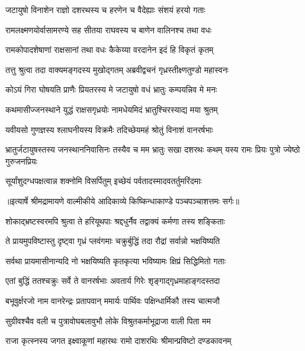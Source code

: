 \twolineshloka
{जटायुषो विनाशेन राज्ञो दशरथस्य च}
{हरणेन च वैदेह्याः संशयं हरयो गताः} %

\twolineshloka
{रामलक्ष्मणयोर्वासामरण्ये सह सीतया}
{राघवस्य च बाणेन वालिनश्च तथा वधः} %

\twolineshloka
{रामकोपादशेषाणां राक्षसानां तथा वधः}
{कैकेय्या वरदानेन इदं हि विकृतं कृतम्} %

\twolineshloka
{तत्तु श्रुत्वा तदा वाक्यमङ्गदस्य मुखोद्गतम्}
{अब्रवीद्वचनं गृध्रस्तीक्ष्णतुण्डो महास्वनः} %

\twolineshloka
{कोऽयं गिरा घोषयति प्राणैः प्रियतरस्य मे}
{जटायुषो वधं भ्रातुः कम्पयन्निव मे मनः} %

\twolineshloka
{कथमासीज्जनस्थाने युद्धं राक्षसगृध्रयोः}
{नामधेयमिदं भ्रातुश्चिरस्याद्य मया श्रुतम्} %

\twolineshloka
{यवीयसो गुणज्ञस्य श्लाघनीयस्य विक्रमैः}
{तदिच्छेयमहं श्रोतुं विनाशं वानरर्षभाः} %

\threelineshloka
{भ्रातुर्जटायुषस्तस्य जनस्थाननिवासिनः}
{तस्यैव च मम भ्रातुः सखा दशरथः कथम्}
{यस्य रामः प्रियः पुत्रो ज्येष्ठो गुरुजनप्रियः} %

\twolineshloka
{सूर्यांशुदग्धपक्षत्वान्न शक्नोमि विसर्पितुम्}
{इच्छेयं पर्वतादस्मादवतर्तुमरिंदमाः} %


{॥इत्यार्षे श्रीमद्रामायणे वाल्मीकीये आदिकाव्ये किष्किन्धाकाण्डे पञ्चपञ्चाशत्तमः सर्गः॥}


\twolineshloka
{शोकाद्भ्रष्टस्वरमपि श्रुत्वा ते हरियूथपाः}
{श्रद्दधुर्नैव तद्वाक्यं कर्मणा तस्य शङ्किताः} %

\twolineshloka
{ते प्रायमुपविष्टास्तु दृष्ट्वा गृध्रं प्लवंगमाः}
{चक्रुर्बुद्धिं तदा रौद्रां सर्वान्नो भक्षयिष्यति} %

\twolineshloka
{सर्वथा प्रायमासीनान्यदि नो भक्षयिष्यति}
{कृतकृत्या भविष्यामः क्षिप्रं सिद्धिमितो गताः} %

\twolineshloka
{एतां बुद्धिं ततश्चक्रुः सर्वे ते वानरर्षभाः}
{अवतार्य गिरेः शृङ्गाद्गृध्रमाहाङ्गदस्तदा} %

\twolineshloka
{बभूवुर्क्षरजो नाम वानरेन्द्रः प्रतापवान्}
{ममार्यः पार्थिवः पक्षिन्धार्मिकौ तस्य चात्मजौ} %

\twolineshloka
{सुग्रीवश्चैव वली च पुत्रावोघबलावुभौ}
{लोके विश्रुतकर्माभूद्राजा वाली पिता मम} %

\twolineshloka
{राजा कृत्स्नस्य जगत इक्ष्वाकूणां महारथः}
{रामो दाशरथिः श्रीमान्प्रविष्टो दण्डकावनम्} %

